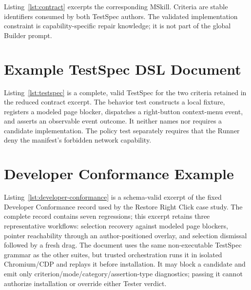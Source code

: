 \documentclass[10pt]{article}
\begin{document}


Listing~\ref{lst:contract} excerpts the corresponding MSkill. Criteria are stable
identifiers consumed by both TestSpec authors. The validated implementation constraint
is capability-specific repair knowledge; it is not part of the global Builder prompt.



\section{Example TestSpec DSL Document}
\label{app:testspec}

Listing~\ref{lst:testspec} is a complete, valid TestSpec for the two criteria retained
in the reduced contract excerpt. The behavior test
constructs a local fixture, registers a modeled page blocker, dispatches a right-button
context-menu event, and asserts an observable event outcome. It neither names nor
requires a candidate implementation. The policy test separately requires that the
Runner deny the manifest's forbidden network capability.



\section{Developer Conformance Example}
\label{app:developer-conformance}

Listing~\ref{lst:developer-conformance} is a schema-valid excerpt of the fixed
Developer Conformance record used by the Restore Right Click case study. The complete
record contains seven regressions; this excerpt retains three representative workflows:
selection recovery against modeled page blockers, pointer reachability through an
author-positioned overlay, and selection dismissal followed by a fresh drag. The document
uses the same non-executable TestSpec grammar as the other suites, but trusted orchestration
runs it in isolated Chromium/CDP and replays it before installation. It may block a
candidate and emit only criterion/mode/category/assertion-type diagnostics; passing it cannot authorize
installation or override either Tester verdict.
\end{document}
